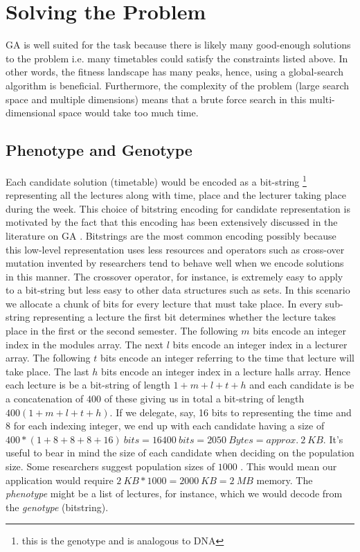 \documentclass[a4paper, 12pt, titlepage]{article}
\begin{document}

\section*{Solving the Problem}

GA is well suited for the task because there is likely many good-enough
solutions to the problem i.e. many timetables could satisfy the
constraints listed above. In other words, the fitness landscape has
many peaks, hence, using a global-search algorithm is beneficial.
Furthermore, the complexity of the problem (large search
space and multiple dimensions) means that a brute force search in this
multi-dimensional space would take too much time.

\subsection*{Phenotype and Genotype}

Each candidate solution (timetable) would be encoded as a bit-string
\footnote{this is the genotype and is analogous to DNA} representing all
the lectures along with time, place and the lecturer taking place during
the week.  This choice of bitstring encoding for candidate representation
is motivated by the fact that this encoding has been extensively discussed
in the literature on GA \cite[p.~103]{eberhart2007}. Bitstrings are
the most common encoding \cite[p.~127]{norvig2010} possibly because
this low-level representation uses less resources and operators such as
cross-over mutation invented by researchers tend to behave well when we
encode solutions in this manner.  The crossover operator, for instance,
is extremely easy to apply to a bit-string but less easy to other
data structures such as sets.  In this scenario we allocate a chunk
of bits for every lecture that must take place.  In every sub-string
representing a lecture the first bit determines whether the lecture
takes place in the first or the second semester.  The following \(m\)
bits encode an integer index in the modules array.  The next \(l\)
bits encode an integer index in a lecturer array. The following \(t\)
bits encode an integer referring to the time that lecture will take
place. The last \(h\) bits encode an integer index in a lecture halls
array. Hence each lecture is be a bit-string of length \(1 + m + l + t +
h\) and each candidate is be a concatenation of \(400\) of these giving
us in total a bit-string of length \(400(1 + m + l + t + h)\). If we
delegate, say, 16 bits to representing the time and 8 for each indexing
integer, we end up with each candidate having a size of \(400 * (1 +
8 + 8 + 8 + 16)\ bits = 16400\ bits = 2050\ Bytes = approx.\ 2\ KB \).
It's useful to bear in mind the size of each candidate when deciding on
the population size. Some researchers suggest population sizes of \(1000\)
\cite[p.~25]{heaton2014}. This would mean our application would require
\(2\ KB * 1000 = 2000\ KB = 2\ MB\) memory.  The \emph{phenotype} might be a
list of lectures, for instance, which we would decode from the \emph{genotype}
(bitstring).
\end{document}
